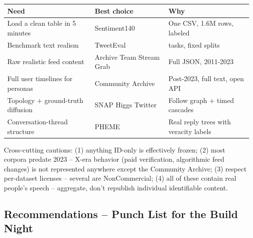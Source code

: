 \documentclass[twocolumn,10pt,letterpaper]{article}
\begin{document}
\vspace{0.4em}
\noindent
\small
\begin{tabularx}{\columnwidth}{@{}>{\raggedright\arraybackslash}X>{\raggedright\arraybackslash}X>{\raggedright\arraybackslash}X@{}}
\toprule
\textbf{Need} & \textbf{Best choice} & \textbf{Why} \\
\midrule
Load a clean table in 5 minutes & Sentiment140 & One CSV, 1.6M rows, labeled \\
Benchmark text realism & TweetEval & 7 tasks, fixed splits \\
Raw realistic feed content & Archive Team Stream Grab & Full JSON, 2011-2023 \\
Full user timelines for personas & Community Archive & Post-2023, full text, open API \\
Topology + ground-truth diffusion & SNAP Higgs Twitter & Follow graph + timed cascades \\
Conversation-thread structure & PHEME & Real reply trees with veracity labels \\
\bottomrule
\end{tabularx}
\vspace{0.4em}

Cross-cutting cautions: (1) anything ID-only is effectively frozen; (2) most corpora predate 2023 -- X-era behavior (paid verification, algorithmic feed changes) is not represented anywhere except the Community Archive; (3) respect per-dataset licenses -- several are NonCommercial; (4) all of these contain real people's speech -- aggregate, don't republish individual identifiable content.


\subsection{Recommendations -- Punch List for the Build Night}
\end{document}
